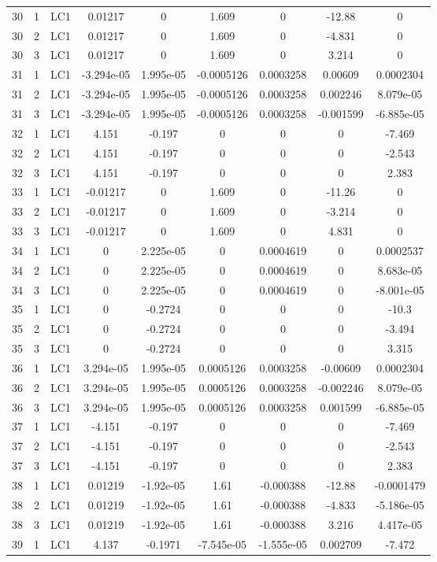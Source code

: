 \documentclass{article}%
\begin{document}
\begin{longtable}{| c c c | c c c c c c |}
30&1&LC1&0.01217&0&1.609&0&{-}12.88&0\\%
30&2&LC1&0.01217&0&1.609&0&{-}4.831&0\\%
30&3&LC1&0.01217&0&1.609&0&3.214&0\\%
31&1&LC1&{-}3.294e{-}05&1.995e{-}05&{-}0.0005126&0.0003258&0.00609&0.0002304\\%
31&2&LC1&{-}3.294e{-}05&1.995e{-}05&{-}0.0005126&0.0003258&0.002246&8.079e{-}05\\%
31&3&LC1&{-}3.294e{-}05&1.995e{-}05&{-}0.0005126&0.0003258&{-}0.001599&{-}6.885e{-}05\\%
32&1&LC1&4.151&{-}0.197&0&0&0&{-}7.469\\%
32&2&LC1&4.151&{-}0.197&0&0&0&{-}2.543\\%
32&3&LC1&4.151&{-}0.197&0&0&0&2.383\\%
33&1&LC1&{-}0.01217&0&1.609&0&{-}11.26&0\\%
33&2&LC1&{-}0.01217&0&1.609&0&{-}3.214&0\\%
33&3&LC1&{-}0.01217&0&1.609&0&4.831&0\\%
34&1&LC1&0&2.225e{-}05&0&0.0004619&0&0.0002537\\%
34&2&LC1&0&2.225e{-}05&0&0.0004619&0&8.683e{-}05\\%
34&3&LC1&0&2.225e{-}05&0&0.0004619&0&{-}8.001e{-}05\\%
35&1&LC1&0&{-}0.2724&0&0&0&{-}10.3\\%
35&2&LC1&0&{-}0.2724&0&0&0&{-}3.494\\%
35&3&LC1&0&{-}0.2724&0&0&0&3.315\\%
36&1&LC1&3.294e{-}05&1.995e{-}05&0.0005126&0.0003258&{-}0.00609&0.0002304\\%
36&2&LC1&3.294e{-}05&1.995e{-}05&0.0005126&0.0003258&{-}0.002246&8.079e{-}05\\%
36&3&LC1&3.294e{-}05&1.995e{-}05&0.0005126&0.0003258&0.001599&{-}6.885e{-}05\\%
37&1&LC1&{-}4.151&{-}0.197&0&0&0&{-}7.469\\%
37&2&LC1&{-}4.151&{-}0.197&0&0&0&{-}2.543\\%
37&3&LC1&{-}4.151&{-}0.197&0&0&0&2.383\\%
38&1&LC1&0.01219&{-}1.92e{-}05&1.61&{-}0.000388&{-}12.88&{-}0.0001479\\%
38&2&LC1&0.01219&{-}1.92e{-}05&1.61&{-}0.000388&{-}4.833&{-}5.186e{-}05\\%
38&3&LC1&0.01219&{-}1.92e{-}05&1.61&{-}0.000388&3.216&4.417e{-}05\\%
39&1&LC1&4.137&{-}0.1971&{-}7.545e{-}05&{-}1.555e{-}05&0.002709&{-}7.472\\%

\end{longtable}
\end{document}
